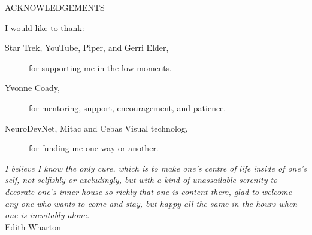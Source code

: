 \newpage
{}

\begin{center}
ACKNOWLEDGEMENTS
\end{center}

\noindent I would like to thank:
\begin{description}
\item[Star Trek, YouTube, Piper, and Gerri Elder, ]
	for supporting me in the low moments.
\item[Yvonne Coady,]
	for  mentoring, support, encouragement, and patience.
\item[NeuroDevNet, Mitac and Cebas Visual technolog, ]
	for funding me one way or another.
\end{description}

\begin{flushright}
\textit{I believe I know the only cure, which is to make
one's centre of life inside of one's self, not
selfishly or excludingly, but with a kind of
unassailable serenity-to decorate one's inner house
so richly that one is content there, glad to welcome
any one who wants to come and stay, but happy all
the same in the hours when one is inevitably alone.}
\\
Edith Wharton \\
\end{flushright}
